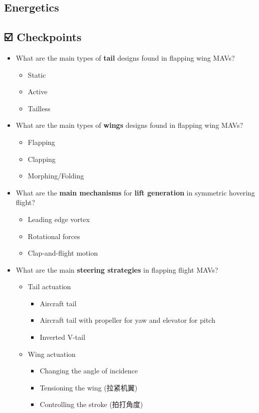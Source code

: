 \documentclass[]{article}
\begin{document}
\subsection{Energetics}\label{header-n1664}

\subsection{☑️ Checkpoints}\label{header-n1665}

\begin{itemize}
\item
  What are the main types of \textbf{tail} designs found in flapping
  wing MAVs?

  \begin{itemize}
  \item
    Static
  \item
    Active
  \item
    Tailless
  \end{itemize}
\item
  What are the main types of \textbf{wings} designs found in flapping
  wing MAVs?

  \begin{itemize}
  \item
    Flapping
  \item
    Clapping
  \item
    Morphing/Folding
  \end{itemize}
\item
  What are the \textbf{main mechanisms} for \textbf{lift generation} in
  symmetric hovering flight?

  \begin{itemize}
  \item
    Leading edge vortex
  \item
    Rotational forces
  \item
    Clap-and-flight motion
  \end{itemize}
\item
  What are the main \textbf{steering strategies} in flapping flight
  MAVs?

  \begin{itemize}
  \item
    Tail actuation

    \begin{itemize}
    \item
      Aircraft tail
    \item
      Aircraft tail with propeller for yaw and elevator for pitch
    \item
      Inverted V-tail
    \end{itemize}
  \item
    Wing actuation

    \begin{itemize}
    \item
      Changing the angle of incidence
    \item
      Tensioning the wing (拉紧机翼)
    \item
      Controlling the stroke (拍打角度)
    \end{itemize}
  \end{itemize}
\end{itemize}
\end{document}
